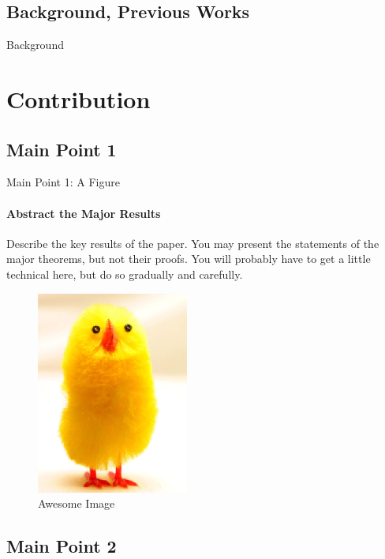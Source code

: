 \documentclass[11pt]{beamer}              %
\begin{document}
\subsection{Background, Previous Works}
\begin{frame}{Background}

\end{frame}




\section{Contribution}
\subsection{Main Point 1}
\begin{frame}{Main Point 1: A Figure}
\framesubtitle{Abstract the Major Results}
Describe the key results of the paper. You may present the statements of the major theorems, but not their proofs. You will probably have to get a little technical here, but do so gradually and carefully.

\begin{figure}
    \centering
    \includegraphics[scale=0.5]{figures/Chick1.png}
    \caption{Awesome Image}
    \label{fig:awesome_image}
\end{figure}
\note{
}
\end{frame}


\subsection{Main Point 2}
\end{document}
